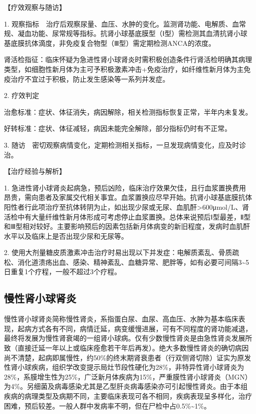 【疗效观察与随访】

1.
观察指标　治疗后观察尿量、血压、水肿的变化。监测肾功能、电解质、血常规、凝血功能、尿常规等指标。抗肾小球基底膜型（Ⅰ型）需检测其血清抗肾小球基底膜抗体滴度，非免疫复合物型（Ⅲ型）需定期检测ANCA的浓度。

肾活检指征：临床怀疑为急进性肾小球肾炎时需积极创造条件行肾活检明确其病理类型，如细胞性新月体为主可予积极激素冲击+免疫治疗，如纤维性新月体为主免疫治疗不宜过于积极，防止发生感染等一系列并发症。

2. 疗效判定

治愈标准：症状、体征消失，病因解除，相关检测指标恢复正常，半年内未复发。

好转标准：症状、体征减轻，病因未能完全解除，部分指标仍时有不正常。

3.
随访　密切观察病情变化，定期检测相关指标，一旦发现病情变化，应及时诊治。

【治疗经验与解析】

1.
急进性肾小球肾炎起病急，预后凶险，临床治疗效果欠佳，且行血浆置换费用昂贵，需向患者及家属交代相关事宜。血浆置换应尽早开始。抗肾小球基底膜抗体阳性者行此项治疗至抗体转阴为止，如出现少尿或无尿、血肌酐\textgreater{}600μmol/L、肾活检中有大量纤维性新月体形成可考虑停止血浆置换。总体来说预后Ⅰ型最差，Ⅱ型和Ⅲ型相对较好。主要影响预后的因素包括新月体病变的新旧程度，发病时血肌酐水平以及临床上是否出现少尿和无尿等。

2.
使用大剂量糖皮质激素冲击治疗时易出现以下并发症：电解质紊乱、骨质疏松、消化道溃疡出血、感染、精神紊乱、血糖异常、肥胖等，如有必要可间隔3\textasciitilde{}5日重复1个疗程，一般不超过3个疗程。

\subsection{慢性肾小球肾炎}

慢性肾小球肾炎简称慢性肾炎，系指蛋白尿、血尿、高血压、水肿为基本临床表现，起病方式各有不同，病情迁延，病变缓慢进展，可有不同程度的肾功能减退，最终将发展为慢性肾衰竭的一组肾小球病。仅有少数慢性肾炎是由急性肾炎发展所致（直接迁延一年以上或临床痊愈若干年后再发）。绝大多数慢性肾炎的确切病因尚不清楚，起病即属慢性，约50\%的终末期肾衰患者（行双侧肾切除）证实为原发性肾小球疾病，组织学改变提示局灶节段性硬化为28\%，非特异性肾小球肾炎为28\%，系膜增生性为25\%，广泛新月体疾病为15\%，严重膜性肾小球肾炎（MGN）为4\%。另细菌及病毒感染尤其是乙型肝炎病毒感染亦可引起慢性肾炎。由于本组疾病的病理类型及病期不同，主要临床表现可各不相同，疾病表现呈多样化，治疗困难，预后较差。一般人群中发病率不明，但在尸检中占0.5\%\textasciitilde{}1\%。

